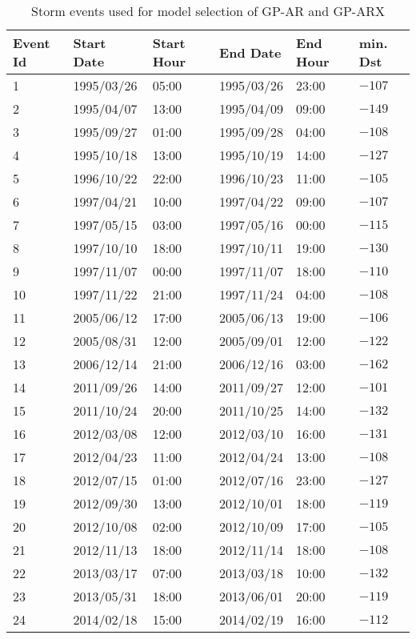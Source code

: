    \begin{table}[h]
    \centering
    \caption{Storm events used for model selection of GP-AR and GP-ARX}
    \label{table:validationstorms}
    \begin{tabular}{llllll}
    \hline
    Event Id & Start Date & Start Hour & End Date & End Hour & min. Dst \\ \hline
    1 & 1995/03/26 & 05:00 & 1995/03/26 & 23:00 & $−107$ \\
    2 & 1995/04/07 & 13:00 & 1995/04/09 & 09:00 & $−149$ \\
    3 & 1995/09/27 & 01:00 & 1995/09/28 & 04:00 & $−108$ \\
    4 & 1995/10/18 & 13:00 & 1995/10/19 & 14:00 & $−127$ \\
    5 & 1996/10/22 & 22:00 & 1996/10/23 & 11:00 & $−105$ \\
    6 & 1997/04/21 & 10:00 & 1997/04/22 & 09:00 & $−107$ \\
    7 & 1997/05/15 & 03:00 & 1997/05/16 & 00:00 & $−115$ \\
    8 & 1997/10/10 & 18:00 & 1997/10/11 & 19:00 & $−130$ \\
    9 & 1997/11/07 & 00:00 & 1997/11/07 & 18:00 & $−110$ \\
    10 & 1997/11/22 & 21:00 & 1997/11/24 & 04:00 & $−108$ \\
    11 & 2005/06/12 & 17:00 & 2005/06/13 & 19:00 & $−106$ \\
    12 & 2005/08/31 & 12:00 & 2005/09/01 & 12:00 & $−122$ \\
    13 & 2006/12/14 & 21:00 & 2006/12/16 & 03:00 & $−162$ \\
    14 & 2011/09/26 & 14:00 & 2011/09/27 & 12:00 & $−101$ \\
    15 & 2011/10/24 & 20:00 & 2011/10/25 & 14:00 & $−132$ \\
    16 & 2012/03/08 & 12:00 & 2012/03/10 & 16:00 & $−131$ \\
    17 & 2012/04/23 & 11:00 & 2012/04/24 & 13:00 & $−108$ \\
    18 & 2012/07/15 & 01:00 & 2012/07/16 & 23:00 & $−127$ \\
    19 & 2012/09/30 & 13:00 & 2012/10/01 & 18:00 & $−119$ \\
    20 & 2012/10/08 & 02:00 & 2012/10/09 & 17:00 & $−105$ \\
    21 & 2012/11/13 & 18:00 & 2012/11/14 & 18:00 & $−108$ \\
    22 & 2013/03/17 & 07:00 & 2013/03/18 & 10:00 & $−132$ \\
    23 & 2013/05/31 & 18:00 & 2013/06/01 & 20:00 & $−119$ \\
    24 & 2014/02/18 & 15:00 & 2014/02/19 & 16:00 & $−112$
    \end{tabular}
    \end{table}
    
